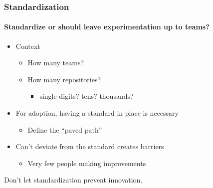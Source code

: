 
\begin{frame}
  \frametitle{Standardization}
  \framesubtitle{Standardize or should leave experimentation up to teams?}

  \begin{itemize}
    \pause
    \item Context
    \begin{itemize}
      \item How many teams?
      \item How many repositories?
        \begin{itemize}
          \item single-digits? tens? thousands?
        \end{itemize}
    \end{itemize}
    \pause
    \item For adoption, having a standard in place is necessary
      \begin{itemize}
        \item Define the ``paved path''
      \end{itemize}
    \pause
    \item Can't deviate from the standard creates barriers
      \begin{itemize}
        \item Very few people making improvements
      \end{itemize}
  \end{itemize}

    \vspace{1em}
    \centering
    \pause
    Don't let standardization prevent innovation.
\end{frame}
